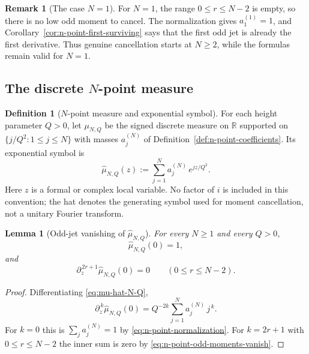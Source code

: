 \documentclass[11pt,a4paper]{amsart}
\numberwithin{equation}{section}
\theoremstyle{plain}
\newtheorem{lemma}[theorem]{Lemma}
\theoremstyle{definition}
\newtheorem{definition}[theorem]{Definition}
\newtheorem{remark}[theorem]{Remark}
\begin{document}
\begin{remark}[The case \(N=1\)]
\label{rem:n-point-N-equals-one}
For \(N=1\), the range \(0\le r\le N-2\) is empty, so there is no
low odd moment to cancel.  The normalization gives \(a_1^{(1)}=1\), and
Corollary~\ref{cor:n-point-first-surviving} says that the first odd
jet is already the first derivative.  Thus genuine cancellation starts
at \(N\ge2\), while the formulas remain valid for \(N=1\).
\end{remark}


\subsection{The discrete \(N\)-point measure}
\label{subsec:n-point-measure}

\begin{definition}[\(N\)-point measure and exponential symbol]
\label{def:n-point-measure}
For each height parameter \(Q>0\), let \(\mu_{N,Q}\) be the signed
discrete measure on \(\mathbb R\) supported on
\(\{j/Q^2:1\le j\le N\}\) with masses \(a_j^{(N)}\) of
Definition~\ref{def:n-point-coefficients}.  Its exponential symbol is
\begin{equation}
\label{eq:mu-hat-N-Q}
        \widehat\mu_{N,Q}(z)
        := \sum_{j=1}^N a_j^{(N)}\, e^{j z / Q^2}.
\end{equation}
Here \(z\) is a formal or complex local variable.  No factor of \(i\) is
included in this convention; the hat denotes the generating symbol used
for moment cancellation, not a unitary Fourier transform.
\end{definition}

\begin{lemma}[Odd-jet vanishing of \(\widehat\mu_{N,Q}\)]
\label{lem:n-point-odd-moment-cancellation}
For every \(N\ge 1\) and every \(Q>0\),
\begin{equation}
\label{eq:mu-hat-normalization}
        \widehat\mu_{N,Q}(0) = 1,
\end{equation}
and
\begin{equation}
\label{eq:mu-hat-odd-vanishing}
        \partial_z^{\,2r+1}\widehat\mu_{N,Q}(0) = 0
        \qquad (0 \le r \le N - 2).
\end{equation}
\end{lemma}

\begin{proof}
Differentiating \eqref{eq:mu-hat-N-Q},
\[
        \partial_z^{\,k}\widehat\mu_{N,Q}(0)
        = Q^{-2k}\sum_{j=1}^N a_j^{(N)}\, j^{\,k}.
\]
For \(k=0\) this is \(\sum_j a_j^{(N)} = 1\) by
\eqref{eq:n-point-normalization}.  For \(k=2r+1\) with \(0\le r\le N-2\)
the inner sum is zero by \eqref{eq:n-point-odd-moments-vanish}.
\end{proof}
\end{document}
